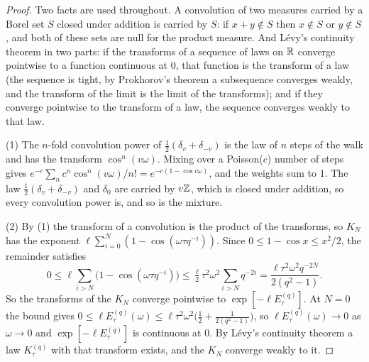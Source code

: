 \begin{proof}
\leanok
{}
Two facts are used throughout. A convolution of two measures carried by a Borel set $S$ closed
under addition is carried by $S$: if $x + y \notin S$ then $x \notin S$ or $y \notin S$, and both
of these sets are null for the product measure. And Lévy's continuity theorem in two parts: if the
transforms of a sequence of laws on $\mathbb{R}$ converge pointwise to a function continuous at $0$, that
function is the transform of a law (the sequence is tight, by Prokhorov's theorem a subsequence
converges weakly, and the transform of the limit is the limit of the transforms); and if they
converge pointwise to the transform of a law, the sequence converges weakly to that law.

(1) The $n$-fold convolution power of $\tfrac12(\delta_v + \delta_{-v})$ is the law of $n$ steps of
the walk and has the transform $\cos^n(v\omega)$. Mixing over a Poisson($c$) number of steps gives
$e^{-c}\sum_nc^n\cos^n(v\omega)/n! = e^{-c(1 - \cos v\omega)}$, and the weights sum to $1$. The law
$\tfrac12(\delta_v + \delta_{-v})$ and $\delta_0$ are carried by $v\mathbb{Z}$, which is closed under
addition, so every convolution power is, and so is the mixture.

(2) By (1) the transform of a convolution is the product of the transforms, so $K_N$ has the
exponent $\ell\sum_{i=0}^N(1 - \cos(\omega\tau q^{-i}))$. Since
$0 \le 1 - \cos x \le x^2/2$, the remainder satisfies
\[
  0 \le \ell\sum_{i > N}\bigl(1 - \cos(\omega\tau q^{-i})\bigr)
  \le \tfrac\ell2\tau^2\omega^2\sum_{i>N}q^{-2i} = \frac{\ell\tau^2\omega^2q^{-2N}}{2(q^2 - 1)} .
\]
So the transforms of the $K_N$ converge pointwise to $\exp[-\ell E^{(q)}_\tau]$. At $N = 0$ the
bound gives $0 \le \ell E^{(q)}_\tau(\omega) \le \ell\tau^2\omega^2\bigl(\tfrac12 + \tfrac1{2(q^2 - 1)}\bigr)$,
so $\ell E^{(q)}_\tau(\omega) \to 0$ as $\omega \to 0$ and $\exp[-\ell E^{(q)}_\tau]$ is continuous
at $0$. By Lévy's continuity theorem a law $K^{(q)}_\tau$ with that transform exists, and the $K_N$
converge weakly to it.


\end{proof}
